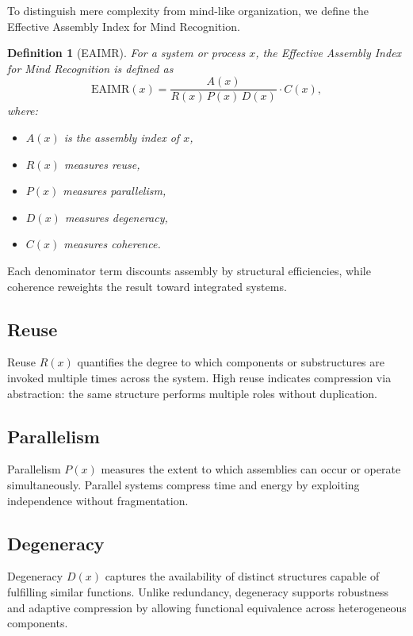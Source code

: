 \documentclass[11pt,letterpaper]{article}
\newtheorem{definition}{Definition}
\begin{document}
To distinguish mere complexity from mind-like organization, we define the Effective Assembly Index for Mind Recognition.

\begin{definition}[EAIMR]
For a system or process $x$, the Effective Assembly Index for Mind Recognition is defined as
\[
\mathrm{EAIMR}(x) =
\frac{A(x)}{R(x)\,P(x)\,D(x)} \cdot C(x),
\]
where:
\begin{itemize}
  \item $A(x)$ is the assembly index of $x$,
  \item $R(x)$ measures reuse,
  \item $P(x)$ measures parallelism,
  \item $D(x)$ measures degeneracy,
  \item $C(x)$ measures coherence.
\end{itemize}
\end{definition}

Each denominator term discounts assembly by structural efficiencies, while coherence reweights the result toward integrated systems.

\subsection{Reuse}

Reuse $R(x)$ quantifies the degree to which components or substructures are invoked multiple times across the system. High reuse indicates compression via abstraction: the same structure performs multiple roles without duplication.

\subsection{Parallelism}

Parallelism $P(x)$ measures the extent to which assemblies can occur or operate simultaneously. Parallel systems compress time and energy by exploiting independence without fragmentation.

\subsection{Degeneracy}

Degeneracy $D(x)$ captures the availability of distinct structures capable of fulfilling similar functions. Unlike redundancy, degeneracy supports robustness and adaptive compression by allowing functional equivalence across heterogeneous components.
\end{document}
